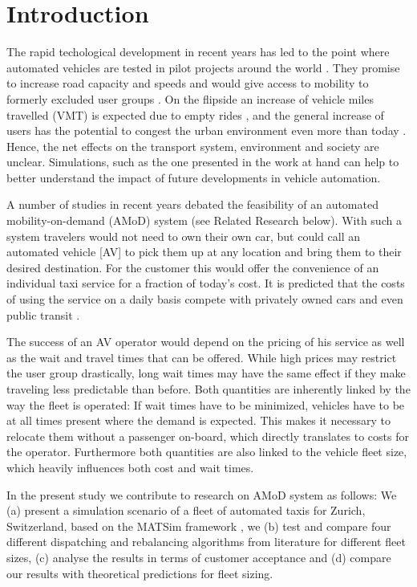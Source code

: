 \section{Introduction}

The rapid techological development in recent years has led to the point where
automated vehicles are tested in pilot projects around the world \citep{ackerman2017hail}.
They promise to increase road
capacity and speeds \citep{Tientrakool2011,Friedrich2015} and would give access to mobility to formerly
excluded user groups \citep{Truong2017}. On the flipside an increase of vehicle
miles travelled (VMT) is expected due to empty rides \citep{Litman2014}, and the general increase
of users has the potential to congest the urban environment even more than today \citep{Meyer2017}.
Hence, the net effects on
the transport system, environment and society are unclear. Simulations, such as
the one presented in the work at hand can help to better understand the impact
of future developments in vehicle automation.

A number of studies in recent years debated the feasibility of an automated
mobility-on-demand (AMoD) system (see Related Research below). With such a system travelers
would not need to own their own car, but could call an automated vehicle [AV] to pick
them up at any location and bring them to their desired destination. For the customer
this would offer the convenience of an individual taxi service
for a fraction of today's cost. It is predicted that the costs of using the
service on a daily basis compete with privately owned cars and even
public transit \citep{Bosch2016a}.

The success of an AV operator would depend on the pricing of his service
as well as the wait and travel times that can be offered. While high prices
may restrict the user group drastically, long wait times may have the same effect
if they make traveling less predictable than before. Both quantities are inherently
linked by the way the fleet is operated: If wait times have to be minimized, vehicles
have to be at all times present where the demand is expected. This makes it necessary to
relocate them without a passenger on-board, which directly translates to costs for
the operator. Furthermore both quantities are also linked to the vehicle fleet
size, which heavily influences both cost and wait times.

In the present study we contribute to research on AMoD system as follows: We
(a) present a simulation scenario of a fleet of automated taxis for Zurich, Switzerland,
based on the MATSim framework \citep{Horni2015}, we (b) test and compare four different dispatching
and rebalancing algorithms from literature for different fleet sizes, (c) analyse the results
in terms of customer acceptance and (d) compare our results with theoretical
predictions for fleet sizing.


